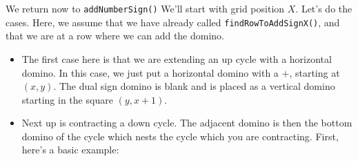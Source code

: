 \documentclass[12pt]{article}
\numberwithin{equation}{section}
\newcommand{\horizontalDominoMaybe}[3]{\filldraw [dominoMaybeStyle] (#2 - 1 + \eps, #1 - 1 + \eps) rectangle + (2 - \teps, 1 -\teps) node [dominoText] {$#3$};}
\newcommand{\verticalDominoMaybeShift}[4]{\filldraw [dominoMaybeStyle] (#2 - 1 + #4 + \eps,  #1 - 1 + \eps) rectangle + (1 - \teps,2 -\teps) node [dominoText] {$#3$};}
\begin{document}
  We return now to \texttt{addNumberSign()}
  We'll start with grid position $X$.
  Let's do the cases.
  Here, we assume that we have already called \linebreak \texttt{findRowToAddSignX()}, and that we are at a row where we can add the domino.
  \begin{itemize}
    \item The first case here is that we are extending an up cycle with a horizontal domino.
    In this case, we just put a horizontal domino with a $+$, starting at $(x, y)$.
    The dual sign domino is blank and is placed as a vertical domino starting in the square $(y, x + 1)$.
    \begin{figure}[H]
      \centering
    \end{figure}


    \item Next up is contracting a down cycle.
    The adjacent domino is then the bottom domino of the cycle which nests the cycle which you are contracting.
    First, here's a basic example:
    \begin{figure}[H]
      \centering
\end{figure}
\end{itemize}
\end{document}
